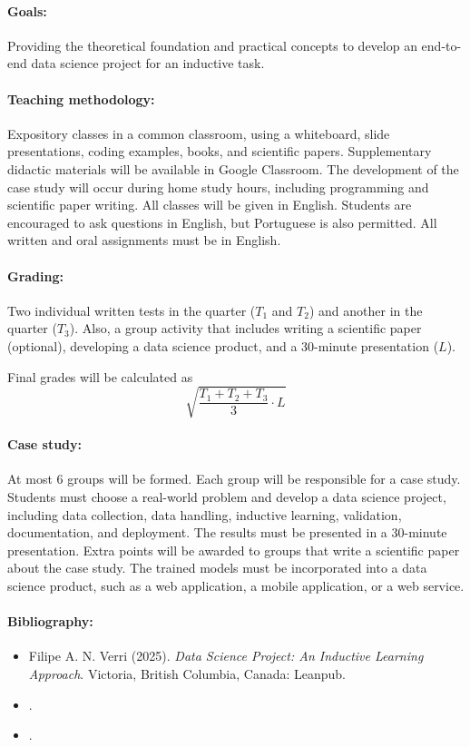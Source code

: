 \paragraph{Goals:}
Providing the theoretical foundation and practical concepts to develop an end-to-end
data science project for an inductive task.

\paragraph{Teaching methodology:}
Expository classes in a common classroom, using a whiteboard, slide presentations, coding
examples, books, and scientific papers.  Supplementary didactic materials will be available
in Google Classroom. The development of the case study will occur during home study
hours, including programming and scientific paper writing.  All classes will be given in
English.  Students are encouraged to ask questions in English, but Portuguese is also
permitted. All written and oral assignments must be in English.

\paragraph{Grading:} Two individual written tests in the  quarter ($T_1$ and $T_2$) and
another in the  quarter ($T_3$).  Also, a group activity that includes writing a
scientific paper (optional), developing a data science product, and a 30-minute presentation ($L$).

Final grades will be calculated as
\begin{equation*}
  \sqrt{\frac{T_1 + T_2 + T_3}{3} \cdot L}
\end{equation*}

\paragraph{Case study:} At most 6 groups will be formed.  Each group will be responsible for
a case study.  Students must choose a real-world problem and develop a data science
project, including data collection, data handling, inductive learning, validation,
documentation, and deployment. The results must be presented in a 30-minute presentation.
Extra points will be awarded to groups that write a scientific paper about the case study.
The trained models must be incorporated into a data science product, such as a web
application, a mobile application, or a web service.

\paragraph{Bibliography:}
\begin{itemize}
  \itemsep 0pt
  \item Filipe A. N. Verri (2025).  \emph{Data Science Project: An Inductive Learning
    Approach}.  Victoria, British Columbia, Canada: Leanpub.
  \item {}.
  \item {}.
\end{itemize}

